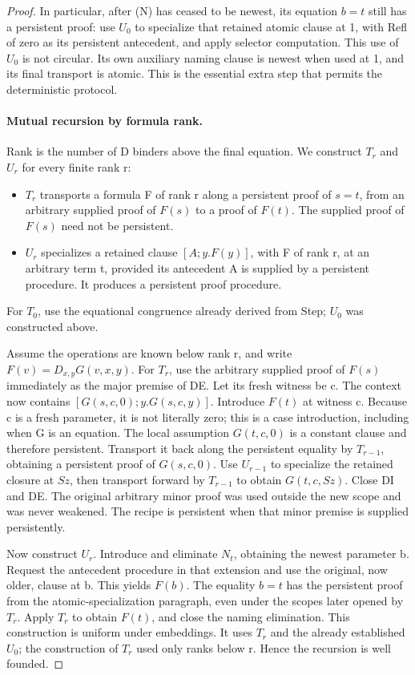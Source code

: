 \documentclass[11pt,letterpaper]{article}
\theoremstyle{definition}
\begin{document}
\begin{proof}
In particular, after (N) has ceased to be newest, its equation \(b=t\)
still has a persistent proof: use \(U_0\) to specialize that retained
atomic clause at 1, with Refl of zero as its persistent antecedent, and
apply selector computation.  This use of \(U_0\) is not circular.
Its own auxiliary naming clause is newest when used at 1, and its final
transport is atomic.  This is the essential extra step that permits the
deterministic protocol.

\paragraph{Mutual recursion by formula rank.}
Rank is the number of D binders above the final equation.  We construct
\(T_r\) and \(U_r\) for every finite rank r:
\begin{itemize}
\item \(T_r\) transports a formula F of rank r along a persistent proof
of \(s=t\), from an arbitrary supplied proof of \(F(s)\) to a proof of
\(F(t)\).  The supplied proof of \(F(s)\) need not be persistent.
\item \(U_r\) specializes a retained clause \([A;y.F(y)]\), with F of
rank r, at an arbitrary term t, provided its antecedent A is supplied by
a persistent procedure.  It produces a persistent proof procedure.
\end{itemize}
For \(T_0\), use the equational congruence already derived from Step;
\(U_0\) was constructed above.

Assume the operations are known below rank r, and write
\(F(v)=D_{x,y}G(v,x,y)\).  For \(T_r\), use the arbitrary supplied
proof of \(F(s)\) immediately as the major premise of DE.  Let its fresh
witness be c.  The context now contains
\([G(s,c,0);y.G(s,c,y)]\).  Introduce \(F(t)\) at witness c.
Because c is a fresh parameter, it is not literally zero; this is a case
introduction, including when G is an equation.  The local assumption
\(G(t,c,0)\) is a constant clause and therefore persistent.  Transport
it back along the persistent equality by \(T_{r-1}\), obtaining a
persistent proof of \(G(s,c,0)\).  Use \(U_{r-1}\) to specialize the
retained closure at \(Sz\), then transport forward by \(T_{r-1}\) to
obtain \(G(t,c,Sz)\).  Close DI and DE.  The original arbitrary minor
proof was used outside the new scope and was never weakened.  The recipe
is persistent when that minor premise is supplied persistently.

Now construct \(U_r\).  Introduce and eliminate \(N_t\), obtaining
the newest parameter b.  Request the antecedent procedure in that
extension and use the original, now older, clause at b.  This yields
\(F(b)\).  The equality \(b=t\) has the persistent proof from the
atomic-specialization paragraph, even under the scopes later opened by
\(T_r\).  Apply \(T_r\) to obtain \(F(t)\), and close the naming
elimination.  This construction is uniform under embeddings.  It uses
\(T_r\) and the already established \(U_0\); the construction of
\(T_r\) used only ranks below r.  Hence the recursion is well founded.


\end{proof}
\end{document}
